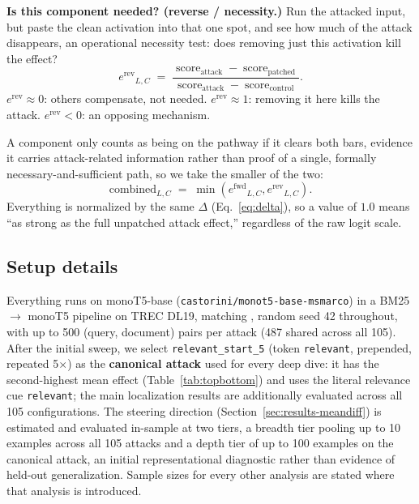 \documentclass[11pt]{article}
\newcommand{\fwd}{\ensuremath{e^{\mathrm{fwd}}}}
\newcommand{\rev}{\ensuremath{e^{\mathrm{rev}}}}
\newcommand{\score}{\operatorname{score}}
\begin{document}
\textbf{Is this component needed? (reverse / necessity.)} Run the attacked
input, but paste the clean activation into that one spot, and see how much of
the attack disappears, an operational necessity test: does removing just
this activation kill the effect?
\begin{equation}
\rev_{L,C} \;=\;
\frac{\score_{\text{attack}} - \score_{\text{patched}}}
     {\score_{\text{attack}} - \score_{\text{control}}}.
\label{eq:rev}
\end{equation}
$\rev\approx0$: others compensate, not needed. $\rev\approx1$: removing it here
kills the attack. $\rev<0$: an opposing mechanism.

A component only counts as being on the pathway if it clears both bars,
evidence it carries attack-related information rather than proof of a
single, formally necessary-and-sufficient path, so we take the smaller of
the two:
\begin{equation}
\text{combined}_{L,C} \;=\; \min(\fwd_{L,C}, \rev_{L,C}).
\label{eq:combined}
\end{equation}
Everything is normalized by the same $\Delta$ (Eq.~\ref{eq:delta}), so a value
of $1.0$ means ``as strong as the full unpatched attack effect,'' regardless
of the raw logit scale.

\subsection{Setup details}

Everything runs on monoT5-base (\texttt{castorini/monot5-base-msmarco}) in
a BM25 $\rightarrow$ monoT5 pipeline on TREC DL19, matching
\citet{parry2024adversarial}, random seed 42 throughout, with up to 500
(query, document) pairs per attack (487 shared across all 105). After the
initial sweep, we select \texttt{relevant\_start\_5} (token
\texttt{relevant}, prepended, repeated 5$\times$) as the
\textbf{canonical attack} used for every deep dive: it has the
second-highest mean effect (Table~\ref{tab:topbottom}) and uses the
literal relevance cue \texttt{relevant}; the main localization results
are additionally evaluated across all 105 configurations. The steering
direction (Section~\ref{sec:results-meandiff}) is estimated and evaluated
in-sample at two tiers, a breadth tier pooling up to 10 examples across
all 105 attacks and a depth tier of up to 100 examples on the canonical
attack, an initial representational diagnostic rather than evidence of
held-out generalization. Sample sizes for every other analysis are stated
where that analysis is introduced.
\end{document}
